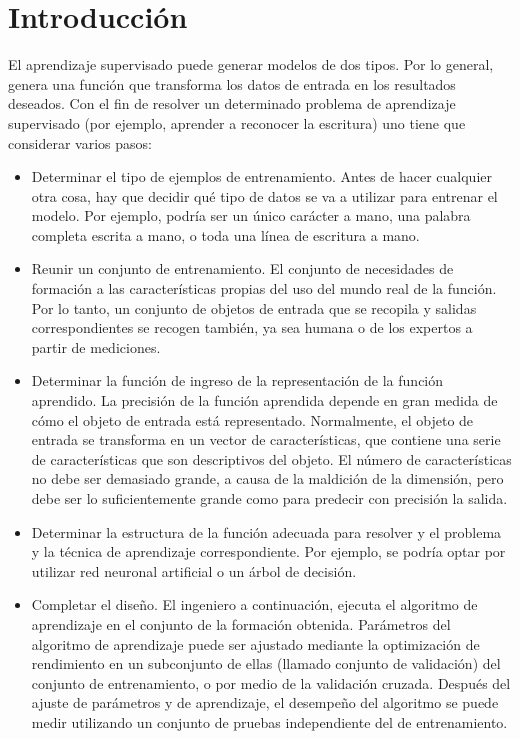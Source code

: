 \documentclass[12pt,a4paper]{report}
\begin{document}
\section{Introducción}
El aprendizaje supervisado puede generar modelos de dos tipos. Por lo general, genera una función que transforma los datos de entrada en los resultados deseados.
Con el fin de resolver un determinado problema de aprendizaje supervisado (por ejemplo, aprender a reconocer la escritura) uno tiene que considerar varios pasos:
\begin{itemize}
\item Determinar el tipo de ejemplos de entrenamiento. Antes de hacer cualquier otra cosa, hay que decidir qué tipo de datos se va a utilizar para entrenar el modelo. Por ejemplo, podría ser un único carácter a mano, una palabra completa escrita a mano, o toda una línea de escritura a mano.
\item Reunir un conjunto de entrenamiento. El conjunto de necesidades de formación a las características propias del uso del mundo real de la función. Por lo tanto, un conjunto de objetos de entrada que se recopila y salidas correspondientes se recogen también, ya sea humana o de los expertos a partir de mediciones.
\item Determinar la función de ingreso de la representación de la función aprendido. La precisión de la función aprendida depende en gran medida de cómo el objeto de entrada está representado. Normalmente, el objeto de entrada se transforma en un vector de características, que contiene una serie de características que son descriptivos del objeto. El número de características no debe ser demasiado grande, a causa de la maldición de la dimensión, pero debe ser lo suficientemente grande como para predecir con precisión la salida.
\item Determinar la estructura de la función adecuada para resolver y el problema y la técnica de aprendizaje correspondiente. Por ejemplo, se podría optar por utilizar red neuronal artificial o un árbol de decisión.
\item Completar el diseño. El ingeniero a continuación, ejecuta el algoritmo de aprendizaje en el conjunto de la formación obtenida. Parámetros del algoritmo de aprendizaje puede ser ajustado mediante la optimización de rendimiento en un subconjunto de ellas (llamado conjunto de validación) del conjunto de entrenamiento, o por medio de la validación cruzada. Después del ajuste de parámetros y de aprendizaje, el desempeño del algoritmo se puede medir utilizando un conjunto de pruebas independiente del de entrenamiento.
\end{itemize}
\end{document}
